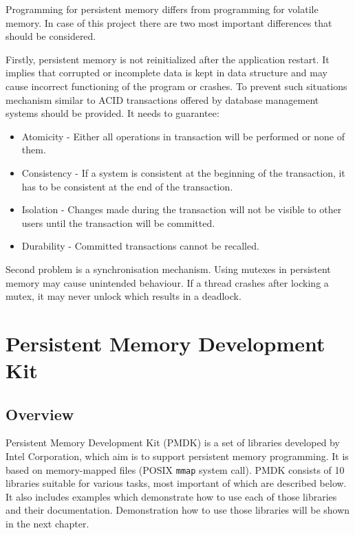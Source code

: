     
        Programming for persistent memory differs from programming for volatile memory. 
        In case of this project there are two most important differences that should be considered.
        
        Firstly, persistent memory is not reinitialized after the application restart. 
        It implies that corrupted or incomplete data is kept in data structure and may cause incorrect functioning of the program or crashes. 
        To prevent such situations mechanism similar to ACID transactions offered by database management systems should be provided. 
        It needs to guarantee:
        \label{ACID}
        \begin{itemize}
            \item Atomicity - Either all operations in transaction will be performed or none of them. 
            \item Consistency - If a system is consistent at the beginning of the transaction, it has to be consistent at the end of the transaction.
            \item Isolation - Changes made during the transaction will not be visible to other users until the transaction will be committed.
            \item Durability - Committed transactions cannot be recalled.
        \end{itemize}
        
        Second problem is a synchronisation mechanism. 
        Using mutexes in persistent memory may cause unintended behaviour. 
        If a thread crashes after locking a mutex, it may never unlock which results in a deadlock. 
      
\section{Persistent Memory Development Kit}

    \subsection{Overview}
        Persistent Memory Development Kit (PMDK) \cite{PmemIo} is a set of libraries developed by Intel Corporation, which aim is to support persistent memory programming. 
        It is based on memory-mapped files (POSIX \texttt{mmap} system call). 
        PMDK consists of 10 libraries suitable for various tasks, most important of which are described below. 
        It also includes examples which demonstrate how to use each of those libraries and their documentation. 
        Demonstration how to use those libraries will be shown in the next chapter.
        

